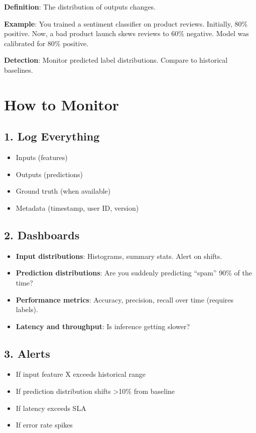 \textbf{Definition}: The distribution of outputs changes.

\textbf{Example}: You trained a sentiment classifier on product reviews. Initially, 80\% positive. Now, a bad product launch skews reviews to 60\% negative. Model was calibrated for 80\% positive.

\textbf{Detection}: Monitor predicted label distributions. Compare to historical baselines.

\section{How to Monitor}

\subsection{1. Log Everything}

\begin{itemize}
\item Inputs (features)
\item Outputs (predictions)
\item Ground truth (when available)
\item Metadata (timestamp, user ID, version)
\end{itemize}

\subsection{2. Dashboards}

\begin{itemize}
\item \textbf{Input distributions}: Histograms, summary stats. Alert on shifts.
\item \textbf{Prediction distributions}: Are you suddenly predicting ``spam'' 90\% of the time?
\item \textbf{Performance metrics}: Accuracy, precision, recall over time (requires labels).
\item \textbf{Latency and throughput}: Is inference getting slower?
\end{itemize}

\subsection{3. Alerts}

\begin{itemize}
\item If input feature X exceeds historical range
\item If prediction distribution shifts >10\% from baseline
\item If latency exceeds SLA
\item If error rate spikes
\end{itemize}

